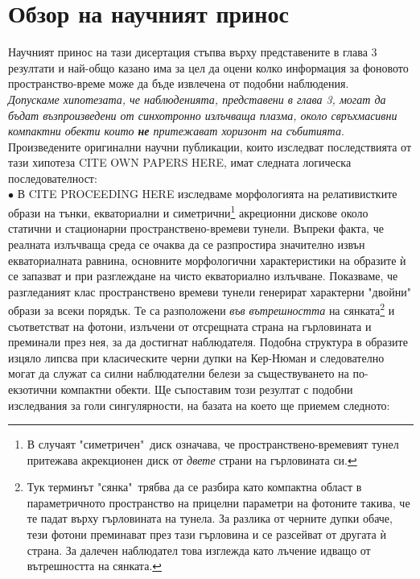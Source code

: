 \section{Обзор на научният принос}

Научният принос на тази дисертация стъпва върху представените в глава 3 резултати и най-общо казано има за цел да оцени колко информация за фоновото пространство-време може да бъде извлечена от подобни наблюдения.\\

 \emph{Допускаме хипотезата, че наблюденията, представени в глава 3, могат да бъдат възпроизведени от синхотронно излъчваща плазма, около свръхмасивни компактни обекти които \textbf{не} притежават хоризонт на събитията}.\\\newline
Произведените оригинални научни публикации, които изследват последствията от тази хипотеза CITE OWN PAPERS HERE, имат следната логическа последователност: \\

\noindent$\bullet$ В CITE PROCEEDING HERE изследваме морфологията на релативистките образи на тънки, екваториални и симетрични\footnote{ В случаят "симетричен"$\,$ диск означава, че пространствено-времевият тунел притежава акрекционен диск от \emph{двете} страни на гърловината си.} акреционни дискове около статични и стационарни пространствено-времеви тунели. Въпреки факта, че реалната излъчваща среда се очаква да се разпростира значително извън екваториалната равнина, основните морфологични характеристики на образите ѝ се запазват и при разглеждане на чисто екваториално излъчване. Показваме, че разгледаният клас пространствено времеви тунели генерират характерни "двойни"$\,$ образи за всеки порядък. Те са разположени \emph{във вътрешността} на сянката\footnote{Тук терминът "сянка"$\,$ трябва да се разбира като компактна област в параметричното пространство на прицелни параметри на фотоните такива, че те падат върху гърловината на тунела. За разлика от черните дупки обаче, тези фотони преминават през тази гърловина и се разсейват от другата ѝ страна. За далечен наблюдател това изглежда като лъчение идващо от вътрешността на сянката.} и съответстват на фотони, излъчени от отсрещната страна на гърловината и преминали през нея, за да достигнат наблюдателя. Подобна структура в образите изцяло липсва при класическите черни дупки на Кер-Нюман и следователно могат да служат са силни наблюдателни белези за съществуването на по-екзотични компактни обекти. Ще съпоставим този резултат с подобни изследвания за голи сингулярности, на базата на което ще приемем следното:\\

